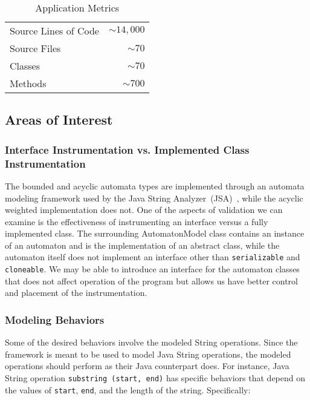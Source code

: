 \documentclass[letterpaper,11pt]{article}
\begin{document}
\begin{table}[ht]\label{tab:app-metrics}
  \centering
  \begin{tabular}{lr}
    \toprule
    Source Lines of Code & \(\sim14,000\) \\
    Source Files         & \(\sim70\) \\
    Classes              & \(\sim70\) \\
    Methods              & \(\sim700\) \\
    \bottomrule
  \end{tabular}
  \caption{Application Metrics}
\end{table}

\subsection{Areas of Interest}

\subsubsection{Interface Instrumentation vs. Implemented Class Instrumentation}

The bounded and acyclic automata types are implemented through an automata
modeling framework used by the Java String Analyzer~(JSA)~\cite{strings2003},
while the acyclic weighted implementation does not.  One of the aspects of
validation we can examine is the effectiveness of instrumenting an interface
versus a fully implemented class.  The surrounding AutomatonModel class
contains an instance of an automaton and is the implementation of an abstract
class, while the automaton itself does not implement an interface other than
\texttt{serializable} and \texttt{cloneable}.  We may be able to introduce an
interface for the automaton classes that does not affect operation of the
program but allows us have better control and placement of the
instrumentation.

\subsubsection{Modeling Behaviors}

Some of the desired behaviors involve the modeled String operations. Since the
framework is meant to be used to model Java String operations, the modeled
operations should perform as their Java counterpart does.  For instance, Java
String operation \texttt{substring~(start, end)} has specific behaviors that
depend on the values of \texttt{start}, \texttt{end}, and the length of the
string.  Specifically:
\end{document}
